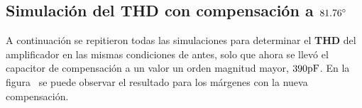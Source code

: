 \begin{table}[H]  %

    \setlength\arrayrulewidth{1.5pt}
    \def\clinecolor{\hhline{|>{\arrayrulecolor{white}}-%
    >{\arrayrulecolor{white}}|-|-|-|}}
	\caption{\footnotesize{THD obtenido a $1 \si[per-mode=symbol]{\kilo\hertz}$ y $10 \si[per-mode=symbol]{\kilo\hertz}$ para modo de operación en clase \textbf{AB} y clase \textbf{A}, compensado a $45.30 \si[per-mode=symbol]{\degree}$.}}
	\label{table:table_THD_vs_freq_and_compensation}
\end{table}



\subsection{Simulación del \textbf{THD} con compensación a $81.76 \si[per-mode=symbol]{\degree}$ }


A continuación se repitieron todas las simulaciones para determinar el \textbf{THD} del amplificador en las mismas condiciones de antes, solo que ahora se llevó el capacitor de compensación a un valor un orden magnitud mayor, $390 \si[per-mode=symbol]{\pico\farad}$. En la figura~ se puede observar el resultado para los márgenes con la nueva compensación. \\

